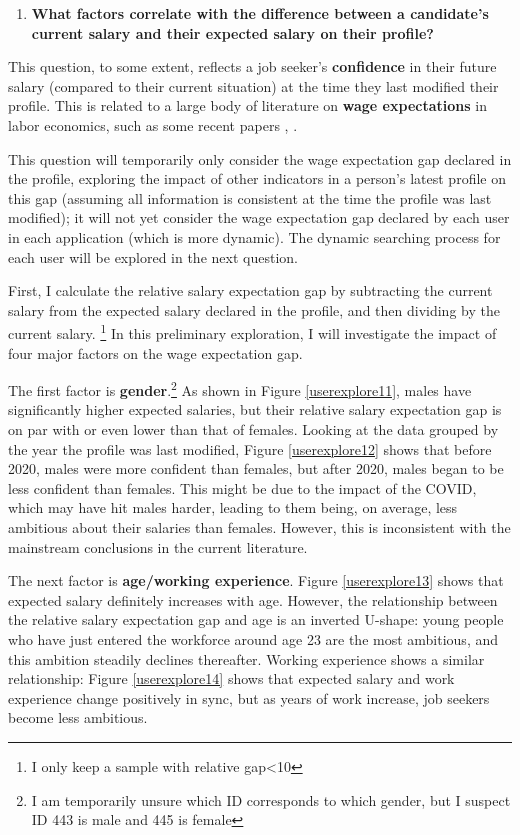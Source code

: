 \documentclass[12pt]{article}
\begin{document}
\begin{enumerate}
    \item \textbf{What factors correlate with the difference between a candidate's current salary and their expected salary on their profile?}    
\end{enumerate}


This question, to some extent, reflects a job seeker's \textbf{confidence} in their future salary (compared to their current situation) at the time they last modified their profile. This is related to a large body of literature on \textbf{wage expectations} in labor economics, such as some recent papers  \cite{roussille2024role}, \cite{kiessling2024gender}.

This question will temporarily only consider the wage expectation gap declared in the profile, exploring the impact of other indicators in a person's latest profile on this gap (assuming all information is consistent at the time the profile was last modified); it will not yet consider the wage expectation gap declared by each user in each application (which is more dynamic). The dynamic searching process for each user will be explored in the next question.

First, I calculate the relative salary expectation gap by subtracting the current salary from the expected salary declared in the profile, and then dividing by the current salary. \footnote{I only keep a sample with relative gap<10} In this preliminary exploration, I will investigate the impact of four major factors on the wage expectation gap.

The first factor is \textbf{gender}.\footnote{I am temporarily unsure which ID corresponds to which gender, but I suspect ID 443 is male and 445 is female} As shown in Figure \ref{userexplore11}, males have significantly higher expected salaries, but their relative salary expectation gap is on par with or even lower than that of females. Looking at the data grouped by the year the profile was last modified, Figure \ref{userexplore12} shows that before 2020, males were more confident than females, but after 2020, males began to be less confident than females. This might be due to the impact of the COVID, which may have hit males harder, leading to them being, on average, less ambitious about their salaries than females. However, this is inconsistent with the mainstream conclusions in the current literature.

The next factor is \textbf{age/working experience}. Figure \ref{userexplore13} shows that expected salary definitely increases with age. However, the relationship between the relative salary expectation gap and age is an inverted U-shape: young people who have just entered the workforce around age 23 are the most ambitious, and this ambition steadily declines thereafter. Working experience shows a similar relationship: Figure \ref{userexplore14} shows that expected salary and work experience change positively in sync, but as years of work increase, job seekers become less ambitious.
\end{document}
